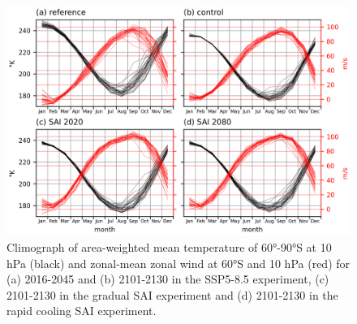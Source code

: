 \begin{figure}[H]
	\centering
	\includegraphics[width=0.95\linewidth]{images/PNJ_climographTU.png}
	\caption{Climograph of area-weighted mean temperature of 60°-90°S at 10 hPa (black) and zonal-mean zonal wind at 60°S and 10 hPa (red) for (a) 2016-2045 and (b) 2101-2130 in the SSP5-8.5 experiment, (c) 2101-2130 in the gradual SAI experiment and (d) 2101-2130 in the rapid cooling SAI experiment.}
	\label{fig:PNJ_climographTU}
\end{figure}